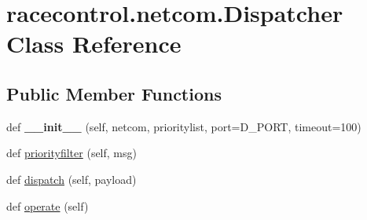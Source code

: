 \hypertarget{classracecontrol_1_1netcom_1_1Dispatcher}{}\section{racecontrol.\+netcom.\+Dispatcher Class Reference}
\label{classracecontrol_1_1netcom_1_1Dispatcher}
\subsection*{Public Member Functions}
\begin{DoxyCompactItemize}
\item 
def {\bfseries \+\_\+\+\_\+init\+\_\+\+\_\+} (self, netcom, prioritylist, port=D\+\_\+\+P\+O\+RT, timeout=100)\hypertarget{classracecontrol_1_1netcom_1_1Dispatcher_a40d53ebebdec4c628392f666ff14a4f4}{}\label{classracecontrol_1_1netcom_1_1Dispatcher_a40d53ebebdec4c628392f666ff14a4f4}

\item 
def \hyperlink{classracecontrol_1_1netcom_1_1Dispatcher_a01b0f08e2145db578fe74208d5e34d9e}{priorityfilter} (self, msg)
\item 
def \hyperlink{classracecontrol_1_1netcom_1_1Dispatcher_a1972a5b40129984301084ff41eab5824}{dispatch} (self, payload)
\item 
def \hyperlink{classracecontrol_1_1netcom_1_1Dispatcher_ae54f350204273958e80248a56943fc0c}{operate} (self)
\end{DoxyCompactItemize}
